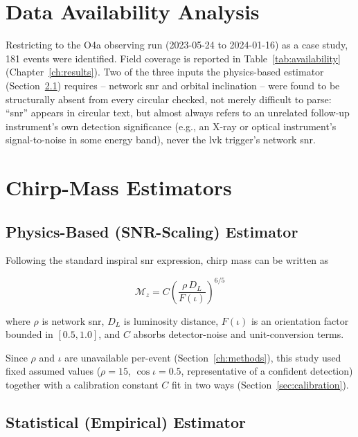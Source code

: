 \section{Data Availability Analysis}

Restricting to the O4a observing run (2023-05-24 to 2024-01-16) as a case study, 181 events were identified. Field coverage is reported in Table~\ref{tab:availability} (Chapter~\ref{ch:results}). Two of the three inputs the physics-based estimator (Section~\ref{sec:physics-estimator}) requires -- network \gls{snr} and orbital inclination -- were found to be structurally absent from every circular checked, not merely difficult to parse: ``\gls{snr}'' appears in circular text, but almost always refers to an unrelated follow-up instrument's own detection significance (e.g., an X-ray or optical instrument's signal-to-noise in some energy band), never the \gls{lvk} trigger's network \gls{snr}.

\section{Chirp-Mass Estimators}

\subsection{Physics-Based (SNR-Scaling) Estimator}
\label{sec:physics-estimator}

Following the standard inspiral \gls{snr} expression, chirp mass can be written as

\begin{equation}
    \mathcal{M}_z = C \left( \frac{\rho \, D_L}{F(\iota)} \right)^{6/5}
    \label{eq:physics-estimator}
\end{equation}

where $\rho$ is network \gls{snr}, $D_L$ is luminosity distance, $F(\iota)$ is an orientation factor bounded in $[0.5, 1.0]$, and $C$ absorbs detector-noise and unit-conversion terms. %

Since $\rho$ and $\iota$ are unavailable per-event (Section~\ref{ch:methods}), this study used fixed assumed values ($\rho = 15$, $\cos\iota = 0.5$, representative of a confident detection) together with a calibration constant $C$ fit in two ways (Section~\ref{sec:calibration}).

\subsection{Statistical (Empirical) Estimator}

